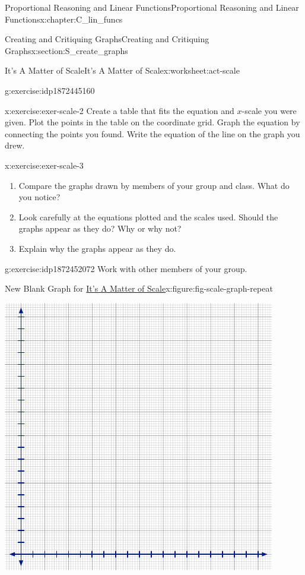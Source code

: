 \documentclass[oneside,10pt,]{book}
\numberwithin{equation}{chapter}
\begin{document}
\begin{chapterptx}{Proportional Reasoning and Linear Functions}{}{Proportional Reasoning and Linear Functions}{}{}{x:chapter:C_lin_funcs}
\begin{sectionptx}{Creating and Critiquing Graphs}{}{Creating and Critiquing Graphs}{}{}{x:section:S_create_graphs}
\begin{worksheet-subsection}{It's A Matter of Scale}{}{It's A Matter of Scale}{}{}{x:worksheet:act-scale}
\begin{divisionexercise}{1}{}{}{g:exercise:idp1872445160}
\end{divisionexercise}%
\begin{divisionexercise}{2}{}{}{x:exercise:exer-scale-2}%
Create a table that fits the equation and \(x\)-scale you were given. Plot the points in the table on the coordinate grid. Graph the equation by connecting the points you found. Write the equation of the line on the graph you drew.%
\end{divisionexercise}%
\begin{divisionexercise}{3}{}{}{x:exercise:exer-scale-3}%
\begin{enumerate}[font=\bfseries,label=(\alph*),ref=\alph*]
\item{}Compare the graphs drawn by members of your group and class. What do you notice?%
\item{}Look carefully at the equations plotted and the scales used. Should the graphs appear as they do? Why or why not?%
\item{}Explain why the graphs appear as they do.%
\end{enumerate}
\end{divisionexercise}%
\begin{divisionexercise}{4}{}{}{g:exercise:idp1872452072}%
Work with other members of your group.%
\begin{figureptx}{New Blank Graph for \hyperref[x:worksheet:act-scale]{It's A Matter of Scale}}{x:figure:fig-scale-graph-repeat}{}%
\begin{image}{0.15}{0.7}{0.15}%
\includegraphics[width=\linewidth]{external/blank-graph.pdf}

\end{image}
\end{figureptx}
\end{divisionexercise}
\end{worksheet-subsection}
\end{sectionptx}
\end{chapterptx}
\end{document}
